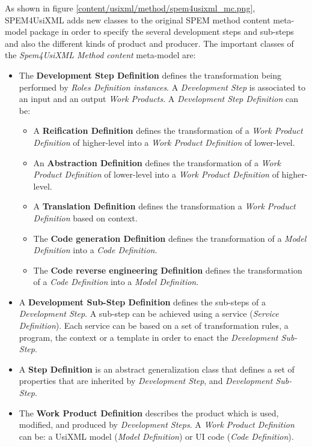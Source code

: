 As shown in figure \ref{content/usixml/method/spem4usixml_mc.png}, SPEM4UsiXML adds new classes to the original SPEM method content meta-model package in order to specify the several development steps and sub-steps and also the different kinds of product and producer. The important classes of the \textit{Spem4UsiXML Method content} meta-model are:
\begin{itemize}

\item The \textbf{Development Step Definition} defines the transformation being performed by \textit{Roles Definition instances}. A \textit{Development Step} is associated to an input and an output \textit{Work Products}. A \textit{Development Step Definition} can be:
\begin{itemize}
\item A \textbf{Reification Definition} defines the transformation of a \textit{Work Product Definition} of higher-level into a \textit{Work Product Definition} of lower-level.
\item An \textbf{Abstraction Definition} defines the transformation of a \textit{Work Product Definition} of lower-level into a \textit{Work Product Definition} of higher-level.
\item A \textbf{Translation Definition} defines the transformation a \textit{Work Product Definition} based on context.
\item The \textbf{Code generation Definition} defines the transformation of a \textit{Model Definition} into a \textit{Code Definition}.
\item The \textbf{Code reverse engineering Definition} defines the transformation of a
\textit{Code Definition} into a \textit{Model Definition}.
\end{itemize}
\item A \textbf{Development Sub-Step Definition} defines the sub-steps of a \textit{Development Step}. A sub-step can be achieved using a service (\textit{Service Definition}). Each service can be based on a set of transformation rules, a program, the context or a template in order to enact the \textit{Development
Sub-Step}.
\item A \textbf{Step Definition} is an abstract generalization class that defines a set of properties that are inherited by \textit{Development Step}, and \textit{Development Sub-Step}.
\item The \textbf{Work Product Definition} describes the product which is used, modified, and produced by \textit{Development Steps}. A \textit{Work Product Definition} can be: a UsiXML model (\textit{Model Definition}) or UI code (\textit{Code Definition}).

\end{itemize}

